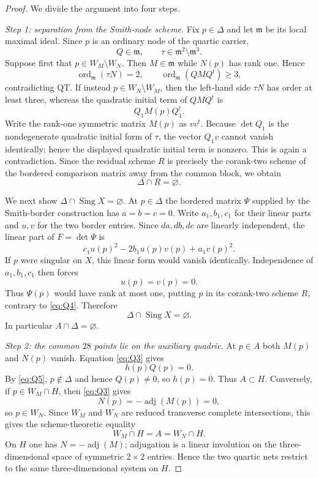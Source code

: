 \documentclass[11pt,reqno]{amsart}
\theoremstyle{remark}
\newcommand{\adj}{\operatorname{adj}}
\begin{document}
\begin{proof}
We divide the argument into four steps.

\emph{Step 1: separation from the Smith-node scheme.}
Fix $p\in\Delta$ and let $\mathfrak m$ be its local maximal ideal.  Since $p$ is an ordinary node of the quartic carrier,
\[
Q\in\mathfrak m,
\qquad
\tau\in\mathfrak m^2\setminus\mathfrak m^3.
\]
Suppose first that $p\in W_M\setminus W_N$.  Then $M\in\mathfrak m$ while $N(p)$ has rank one.  Hence
\[
\operatorname{ord}_{\mathfrak m}(\tau N)=2,
\qquad
\operatorname{ord}_{\mathfrak m}(QMQ^t)\ge3,
\]
contradicting QT.  If instead $p\in W_N\setminus W_M$, then the left-hand side $\tau N$ has order at least three, whereas the quadratic initial term of $QMQ^t$ is
\[
Q_1M(p)Q_1^t.
\]
Write the rank-one symmetric matrix $M(p)$ as $vv^t$.  Because $\det Q_1$ is the nondegenerate quadratic initial form of $\tau$, the vector $Q_1v$ cannot vanish identically; hence the displayed quadratic initial term is nonzero.  This is again a contradiction.  Since the residual scheme $R$ is precisely the corank-two scheme of the bordered comparison matrix away from the common block, we obtain
\[
\Delta\cap R=\varnothing. \tag{Q4}\label{eq:Q4}
\]

We next show $\Delta\cap\operatorname{Sing}X=\varnothing$.  At $p\in\Delta$ the bordered matrix $\Psi$ supplied by the Smith-border construction has $a=b=c=0$.  Write $a_1,b_1,c_1$ for their linear parts and $u,v$ for the two border entries.  Since $da,db,dc$ are linearly independent, the linear part of $F=\det\Psi$ is
\[
c_1u(p)^2-2b_1u(p)v(p)+a_1v(p)^2.
\]
If $p$ were singular on $X$, this linear form would vanish identically.  Independence of $a_1,b_1,c_1$ then forces
\[
u(p)=v(p)=0.
\]
Thus $\Psi(p)$ would have rank at most one, putting $p$ in its corank-two scheme $R$, contrary to \eqref{eq:Q4}.  Therefore
\[
\Delta\cap\operatorname{Sing}X=\varnothing. \tag{Q5}\label{eq:Q5}
\]
In particular $A\cap\Delta=\varnothing$.

\emph{Step 2: the common $28$ points lie on the auxiliary quadric.}
At $p\in A$ both $M(p)$ and $N(p)$ vanish.  Equation \eqref{eq:Q3} gives
\[
h(p)Q(p)=0.
\]
By \eqref{eq:Q5}, $p\notin\Delta$ and hence $Q(p)\ne0$, so $h(p)=0$.  Thus $A\subset H$.  Conversely, if $p\in W_M\cap H$, then \eqref{eq:Q3} gives
\[
N(p)=-\adj(M(p))=0,
\]
so $p\in W_N$.  Since $W_M$ and $W_N$ are reduced transverse complete intersections, this gives the scheme-theoretic equality
\[
W_M\cap H=A=W_N\cap H. \tag{Q6}\label{eq:Q6}
\]
On $H$ one has $N=-\adj(M)$; adjugation is a linear involution on the three-dimensional space of symmetric $2\times2$ entries.  Hence the two quartic nets restrict to the same three-dimensional system on $H$.


\end{proof}
\end{document}
